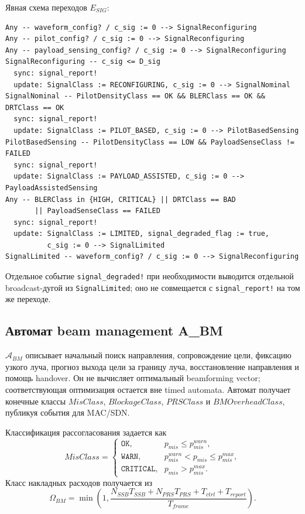 \documentclass[10pt,a4paper]{article}
\newcommand{\code}[1]{\texttt{#1}}
\newcommand{\A}[1]{\mathcal{A}_{#1}}
\begin{document}
Явная схема переходов \(E_{SIG}\):
\begin{verbatim}
Any -- waveform_config? / c_sig := 0 --> SignalReconfiguring
Any -- pilot_config? / c_sig := 0 --> SignalReconfiguring
Any -- payload_sensing_config? / c_sig := 0 --> SignalReconfiguring
SignalReconfiguring -- c_sig <= D_sig
  sync: signal_report!
  update: SignalClass := RECONFIGURING, c_sig := 0 --> SignalNominal
SignalNominal -- PilotDensityClass == OK && BLERClass == OK && DRTClass == OK
  sync: signal_report!
  update: SignalClass := PILOT_BASED, c_sig := 0 --> PilotBasedSensing
PilotBasedSensing -- PilotDensityClass == LOW && PayloadSenseClass != FAILED
  sync: signal_report!
  update: SignalClass := PAYLOAD_ASSISTED, c_sig := 0 --> PayloadAssistedSensing
Any -- BLERClass in {HIGH, CRITICAL} || DRTClass == BAD
       || PayloadSenseClass == FAILED
  sync: signal_report!
  update: SignalClass := LIMITED, signal_degraded_flag := true,
          c_sig := 0 --> SignalLimited
SignalLimited -- waveform_config? / c_sig := 0 --> SignalReconfiguring
\end{verbatim}
Отдельное событие \code{signal\_degraded!} при необходимости выводится отдельной broadcast-дугой из \code{SignalLimited}; оно не совмещается с \code{signal\_report!} на том же переходе.

\subsection{Автомат beam management A\_BM}

\(\A{BM}\) описывает начальный поиск направления, сопровождение цели, фиксацию узкого луча, прогноз выхода цели за границу луча, восстановление направления и помощь handover. Он не вычисляет оптимальный beamforming vector; соответствующая оптимизация остается вне timed automata. Автомат получает конечные классы \(MisClass\), \(BlockageClass\), \(PRSClass\) и \(BMOverheadClass\), публикуя события для MAC/SDN.

Классификация рассогласования задается как
\begin{equation}
MisClass=\begin{cases}
\code{OK},& p_{mis}\le p_{mis}^{warn},\\
\code{WARN},& p_{mis}^{warn}<p_{mis}\le p_{mis}^{max},\\
\code{CRITICAL},& p_{mis}>p_{mis}^{max}.
\end{cases}
\end{equation}
Класс накладных расходов получается из
\begin{equation}
\Omega_{BM}=\min\left(1,\frac{N_{SSB}T_{SSB}+N_{PRS}T_{PRS}+T_{ctrl}+T_{report}}{T_{frame}}\right).
\end{equation}
\end{document}
